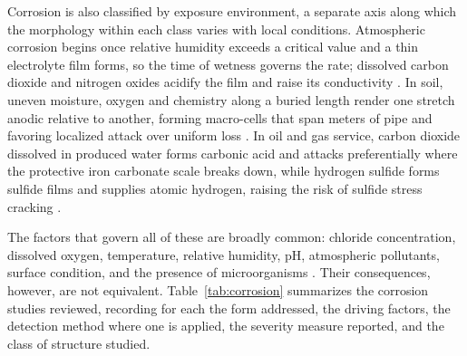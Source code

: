 Corrosion is also classified by exposure environment, a separate axis along
which the morphology within each class varies with local conditions.
Atmospheric corrosion begins once relative humidity exceeds a critical value and
a thin electrolyte film forms, so the time of wetness governs the rate;
dissolved carbon dioxide and nitrogen oxides acidify the film and raise its
conductivity \citep{Arias2025,DeKerf2022}. In soil, uneven moisture, oxygen and chemistry
along a buried length render one stretch anodic relative to another, forming
macro-cells that span meters of pipe and favoring localized attack over uniform
loss \citep{Akhlaghi2023}. In oil and gas service, carbon dioxide dissolved in produced water
forms carbonic acid and attacks preferentially where the protective iron
carbonate scale breaks down, while hydrogen sulfide forms sulfide films and
supplies atomic hydrogen, raising the risk of sulfide stress cracking
\citep{Huang2026a,Alvani2026}.

The factors that govern all of these are broadly common: chloride
concentration, dissolved oxygen, temperature, relative humidity, pH,
atmospheric pollutants, surface condition, and the presence of microorganisms
\citep{Liu2026,Li2022,Liang2021}. Their consequences, however, are not equivalent.
Table~\ref{tab:corrosion} summarizes the corrosion studies reviewed, recording
for each the form addressed, the driving factors, the detection method where one
is applied, the severity measure reported, and the class of structure studied.

